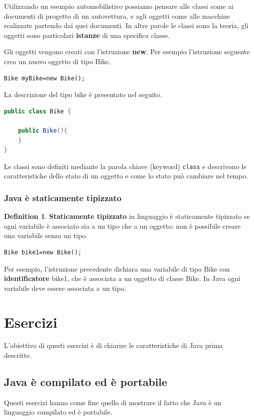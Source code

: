 \documentclass{article}
\theoremstyle{definition}
\newtheorem{mydef}{Definition}
\begin{document}
Utilizzando un esempio automobilistico possiamo pensare alle classi come ai documenti di progetto di un autovettura, e agli oggetti come alle macchine realizzate partendo dai quei documenti. In altre parole le classi sono la teoria, gli oggetti sono particolari \textbf{istanze} di una specifica classe. 

Gli oggetti vengono creati con l'istruzione \textbf{new}. Per esempio l'istruzione seguente crea un nuovo oggetto di tipo Bike. 
\begin{lstlisting}
Bike myBike=new Bike();
\end{lstlisting}
La descrizione del tipo bike \`e presentato nel seguito.
\begin{lstlisting}[language=Java,escapechar=|]
public class Bike {

	public Bike(){
	}
}
\end{lstlisting}
Le classi sono definiti mediante la parola chiave (keyword) \texttt{class} e descrivono le caratteristiche dello stato di un oggetto e come lo stato pu\`o cambiare nel tempo.


\subsubsection{Java \`e staticamente tipizzato}
\begin{mydef} \textbf{Staticamente tipizzato} in linguaggio \`e staticamente tipizzato se ogni variabile \`e associato sia a un tipo che a un oggetto: non \`e possibile creare una variabile senza un tipo.
\end{mydef}
\begin{lstlisting}
Bike bike1=new Bike();
\end{lstlisting}
Per esempio, l'istruzione precedente dichiara una variabile di tipo Bike con \textbf{identificatore} bike1, che \`e associata a un oggetto di classe Bike. In Java ogni variabile deve essere associata a un tipo.

\section{Esercizi}
L'obiettivo di questi esercizi \`e di chiarire le caratteristiche di Java prima descritte.

\subsection{Java \`e compilato ed \`e portabile}
Questi esercizi hanno come fine quello di mostrare il fatto che Java \`e un linguaggio compilato ed \`e portabile. 
\end{document}
